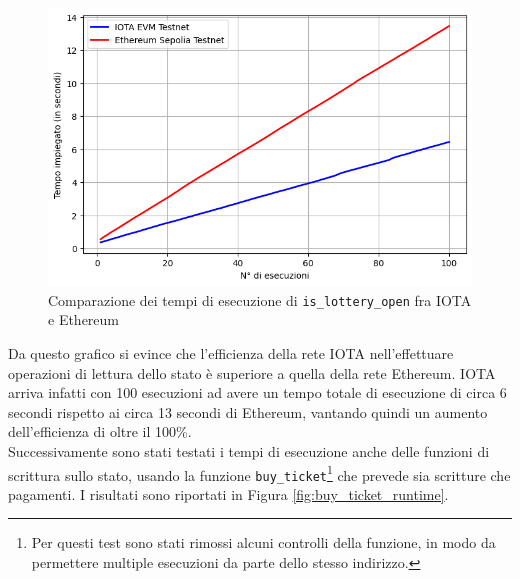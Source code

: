 \documentclass[12pt,a4paper,openright,twoside]{report}
\begin{document}
\begin{figure}[h]
\begin{center}
\includegraphics[width=\textwidth]{figures/my_is_lottery_open_runtime.png}
\caption[Tempi di esecuzione view]{Comparazione dei tempi di esecuzione di \texttt{is\_lottery\_open} fra IOTA e Ethereum}\label{fig:is_lottery_open_runtime}
\end{center}
\end{figure}
Da questo grafico si evince che l'efficienza della rete IOTA nell'effettuare operazioni di lettura dello stato è superiore a quella della rete Ethereum. IOTA arriva infatti con 100 esecuzioni ad avere un tempo totale di esecuzione di circa 6 secondi rispetto ai circa 13 secondi di Ethereum, vantando quindi un aumento dell'efficienza di oltre il 100\%.\\
Successivamente sono stati testati i tempi di esecuzione anche delle funzioni di scrittura sullo stato, usando la funzione \texttt{buy\_ticket}\footnote{Per questi test sono stati rimossi alcuni controlli della funzione, in modo da permettere multiple esecuzioni da parte dello stesso indirizzo.} che prevede sia scritture che pagamenti. I risultati sono riportati in Figura \ref{fig:buy_ticket_runtime}.
\end{document}
